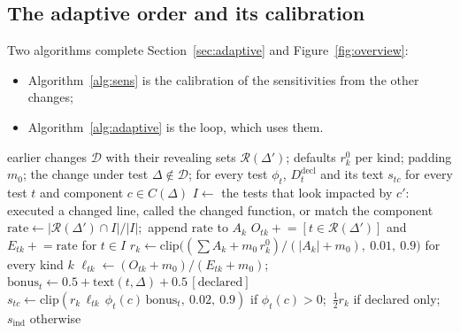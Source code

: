 \documentclass[11pt,a4paper]{article}
\newcommand{\Rev}{\mathcal{R}}
\begin{document}
\subsection{The adaptive order and its calibration}

Two algorithms complete Section~\ref{sec:adaptive} and Figure~\ref{fig:overview}:
\begin{itemize}
  \item Algorithm~\ref{alg:sens} is the calibration of the sensitivities from the other changes;
  \item Algorithm~\ref{alg:adaptive} is the loop, which uses them.
\end{itemize}

\begin{algorithm}[H]
\caption{Calibration of the sensitivities from the earlier changes}
\label{alg:sens}
\begin{algorithmic}[1]
\Require earlier changes $\mathcal{D}$ with their revealing sets $\Rev(\Delta')$; defaults $r^0_k$ per kind;
  padding $m_0$; the change under test $\Delta \notin \mathcal{D}$; for every test $\phi_t$, $D^{\mathrm{decl}}_t$
  and its text
\Ensure $s_{tc}$ for every test $t$ and component $c \in C(\Delta)$
  \State $I \gets$ the tests that look impacted by $c'$: executed a changed line, called the changed function,
    or match the component
  \State $\mathrm{rate} \gets |\Rev(\Delta') \cap I| / |I|$;\ append $\mathrm{rate}$ to $A_k$
  \State $O_{tk} \mathrel{+}= [t \in \Rev(\Delta')]$ and $E_{tk} \mathrel{+}= \mathrm{rate}$ for $t \in I$
\EndFor
\State $r_k \gets \mathrm{clip}\big((\sum A_k + m_0\, r^0_k) / (|A_k| + m_0),\ 0.01,\ 0.9\big)$ for every kind $k$
  \State $\ell_{tk} \gets (O_{tk} + m_0) / (E_{tk} + m_0)$;\quad
    $\mathrm{bonus}_t \gets 0.5 + \mathrm{text}(t, \Delta) + 0.5\,[\text{declared}]$
  \State $s_{tc} \gets \mathrm{clip}(r_k\, \ell_{tk}\, \phi_t(c)\, \mathrm{bonus}_t,\ 0.02,\ 0.9)$ if
    $\phi_t(c) > 0$;\ $\tfrac12 r_k$ if declared only;\ $s_{\mathrm{ind}}$ otherwise
\EndFor
\end{algorithmic}
\end{algorithm}
\end{document}
